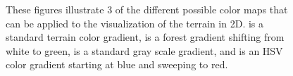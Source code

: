 \begin{figure}[ht]
{	\label{fig:oman_color_2}
}
  \caption{These figures illustrate 3 of the different possible color maps that can be applied to the visualization of the terrain in 2D.  is a standard terrain color gradient,  is a forest gradient shifting from white to green,  is a standard gray scale gradient, and  is an HSV color gradient starting at blue and sweeping to red.}
\label{fig:terrain_color_schemes}
\end{figure}

